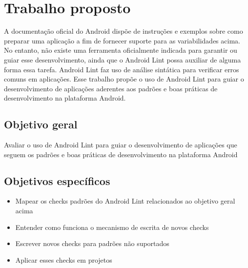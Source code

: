 \chapter{Trabalho proposto}
\label{trabalho_proposto}
A documentação oficial do Android dispõe de instruções e exemplos sobre como 
preparar uma aplicação a fim de fornecer suporte para as variabilidades acima. 
No entanto, não existe uma ferramenta oficialmente indicada para garantir ou guiar 
esse desenvolvimento, ainda que o Android Lint possa auxiliar de alguma forma essa 
tarefa. Android Lint \cite{lint} faz uso de análise sintática para verificar erros comuns 
em aplicações. Esse trabalho propõe o uso de Android Lint para guiar o desenvolvimento 
de aplicações aderentes aos padrões e boas práticas de desenvolvimento na plataforma Android.

\section{Objetivo geral}
Avaliar o uso de Android Lint para guiar o desenvolvimento de aplicações que seguem 
os padrões e boas práticas de desenvolvimento na plataforma Android

\section{Objetivos específicos}

\begin{itemize}
  \item{Mapear os checks padrões do Android Lint relacionados ao objetivo geral acima}
  \item{Entender como funciona o mecanismo de escrita de novos checks}
  \item{Escrever novos checks para padrões não suportados}
  \item{Aplicar esses checks em projetos}
\end{itemize}
